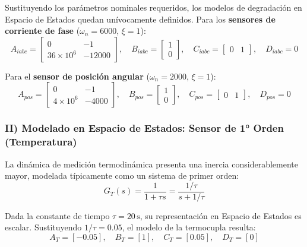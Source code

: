 \documentclass[10pt,a4paper]{article}
\begin{document}
Sustituyendo los parámetros nominales requeridos, los modelos de degradación en Espacio de Estados quedan unívocamente definidos. Para los \textbf{sensores de corriente de fase} ($\omega_n = 6000$, $\xi = 1$):
\begin{equation}
    A_{iabc} = \begin{bmatrix} 0 & -1 \\ 36 \times 10^6 & -12000 \end{bmatrix}, \quad B_{iabc} = \begin{bmatrix} 1 \\ 0 \end{bmatrix}, \quad C_{iabc} = \begin{bmatrix} 0 & 1 \end{bmatrix}, \quad D_{iabc} = 0
\end{equation}

Para el \textbf{sensor de posición angular} ($\omega_n = 2000$, $\xi = 1$):
\begin{equation}
    A_{pos} = \begin{bmatrix} 0 & -1 \\ 4 \times 10^6 & -4000 \end{bmatrix}, \quad B_{pos} = \begin{bmatrix} 1 \\ 0 \end{bmatrix}, \quad C_{pos} = \begin{bmatrix} 0 & 1 \end{bmatrix}, \quad D_{pos} = 0
\end{equation}

\subsubsection{II) Modelado en Espacio de Estados: Sensor de 1° Orden (Temperatura)}

La dinámica de medición termodinámica presenta una inercia considerablemente mayor, modelada típicamente como un sistema de primer orden:
\begin{equation*}
    G_T(s) = \frac{1}{1 + \tau s} = \frac{1/\tau}{s + 1/\tau}
\end{equation*}

Dada la constante de tiempo $\tau = 20\,\text{s}$, su representación en Espacio de Estados es escalar. Sustituyendo $1/\tau = 0.05$, el modelo de la termocupla resulta:
\begin{equation}
    A_T = [-0.05], \quad B_T = [1], \quad C_T = [0.05], \quad D_T = [0]
\end{equation}
\end{document}
